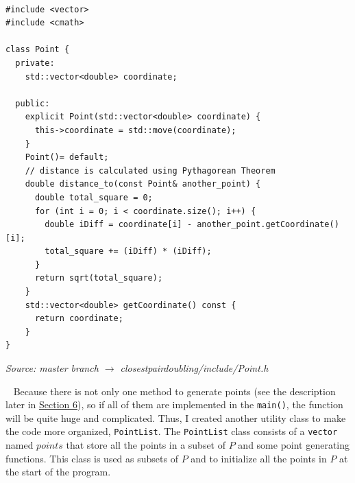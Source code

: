 \documentclass[12pt,english,]{article}
\newcommand{\code}[1]{\colorbox{lbcolor}{\texttt{#1}}}
\begin{document}
~

\begin{lstlisting}
#include <vector>
#include <cmath>

class Point {
  private:
    std::vector<double> coordinate;

  public:
    explicit Point(std::vector<double> coordinate) {
      this->coordinate = std::move(coordinate);
    }
    Point()= default;
    // distance is calculated using Pythagorean Theorem
    double distance_to(const Point& another_point) {
      double total_square = 0;
      for (int i = 0; i < coordinate.size(); i++) {
        double iDiff = coordinate[i] - another_point.getCoordinate()[i];
        total_square += (iDiff) * (iDiff);
      }
      return sqrt(total_square);
    }
    std::vector<double> getCoordinate() const {
      return coordinate;
    }
}
\end{lstlisting}
\vspace{-2truemm}
\begin{minipage}{1\textwidth}
  \begin{flushright}
  {\footnotesize \emph{Source: master branch $\rightarrow$ closestpairdoubling/include/Point.h}\par}
  \end{flushright}
\end{minipage}
\vspace{0.5truemm}

~ Because there is not only one method to generate points (see the
description later in \protect\hyperlink{section6}{Section 6}), so if all
of them are implemented in the \code{main()}, the function will be quite
huge and complicated. Thus, I created another utility class to make the
code more organized, \code{PointList}. The \code{PointList} class
consists of a \code{vector} named \(points\) that store all the points
in a subset of \(P\) and some point generating functions. This class is
used as subsets of \(P\) and to initialize all the points in \(P\) at
the start of the program.

~
\end{document}
